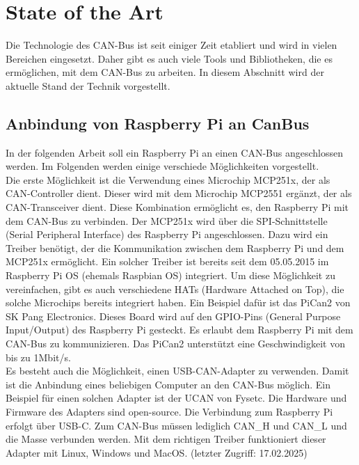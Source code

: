 \section{State of the Art}
Die Technologie des CAN-Bus ist seit einiger Zeit etabliert und wird in vielen Bereichen eingesetzt.
Daher gibt es auch viele Tools und Bibliotheken, die es ermöglichen, mit dem CAN-Bus zu arbeiten.
In diesem Abschnitt wird der aktuelle Stand der Technik vorgestellt.

\subsection{Anbindung von Raspberry Pi an CanBus}
In der folgenden Arbeit soll ein Raspberry Pi an einen CAN-Bus angeschlossen werden. 
Im Folgenden werden einige verschiede Möglichkeiten vorgestellt.\\
Die erste Möglichkeit ist die Verwendung eines Microchip MCP251x, der als CAN-Controller dient. Dieser wird 
mit dem Microchip MCP2551 ergänzt, der als CAN-Transceiver dient. Diese Kombination ermöglicht es, den
Raspberry Pi mit dem CAN-Bus zu verbinden. Der MCP251x wird über die SPI-Schnittstelle (Serial Peripheral Interface) 
des Raspberry Pi angeschlossen. Dazu wird ein Treiber benötigt, der die Kommunikation zwischen dem Raspberry Pi und dem
MCP251x ermöglicht. Ein solcher Treiber ist bereits seit dem 05.05.2015 im Raspberry Pi OS (ehemals Raspbian OS)
integriert. \cite{Salunkhe2016}
Um diese Möglichkeit zu vereinfachen, gibt es auch verschiedene HATs (Hardware Attached on Top), die solche Microchips
bereits integriert haben. Ein Beispiel dafür ist das PiCan2 von SK Pang Electronics. Dieses Board wird auf den 
GPIO-Pins (General Purpose Input/Output) des Raspberry Pi gesteckt. Es erlaubt dem Raspberry Pi mit dem CAN-Bus
zu kommunizieren. Das PiCan2 unterstützt eine Geschwindigkeit von bis zu 1Mbit/s. \cite{Pant2019}\\
Es besteht auch die Möglichkeit, einen USB-CAN-Adapter zu verwenden. Damit ist die Anbindung eines 
beliebigen Computer an den CAN-Bus möglich.
Ein Beispiel für einen solchen Adapter ist der UCAN von Fysetc. Die Hardware und Firmware des Adapters
sind open-source. Die Verbindung zum Raspberry Pi erfolgt über USB-C.
Zum CAN-Bus müssen lediglich CAN\_H und CAN\_L und die Masse verbunden werden. Mit dem richtigen Treiber funktioniert
dieser Adapter mit Linux, Windows und MacOS.  
\cite{FysetcUCAN} (letzter Zugriff: 17.02.2025)


